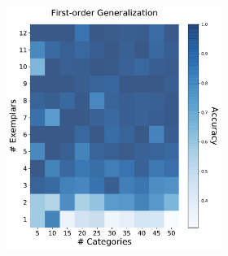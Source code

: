 \begin{figure}[h]
\begin{center}
\begin{subfigure}[b]{0.47\textwidth}
\begin{center}
\begin{subfigure}[b]{0.48\textwidth}
\begin{center}
                        \includegraphics[width=\textwidth]{figures/cnn_1order_accuracy.pdf}
                    \end{center}
                \end{subfigure}
                \begin{subfigure}[b]{0.48\textwidth}
                    \begin{center}

\end{center}
\end{subfigure}
\end{center}
\end{subfigure}
\end{center}
\end{figure}
